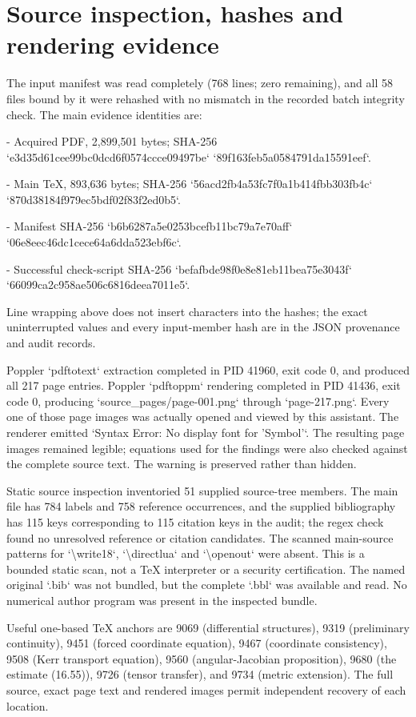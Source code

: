 \documentclass[10pt]{article}
\begin{document}
\section*{Source inspection, hashes and rendering evidence}
The input manifest was read completely (768 lines; zero remaining), and all 58 files bound by it were rehashed with no mismatch in the recorded batch integrity check. The main evidence identities are:\par
- Acquired PDF, 2,899,501 bytes; SHA-256
`e3d35d61cee99bc0dcd6f0574ccce09497be`
`89f163feb5a0584791da15591eef`.\par
- Main TeX, 893,636 bytes; SHA-256
`56acd2fb4a53fc7f0a1b414fbb303fb4c`
`870d38184f979ec5bdf02f83f2ed0b5`.\par
- Manifest SHA-256
`b6b6287a5e0253bcefb11bc79a7e70aff`
`06e8eec46dc1cece64a6dda523ebf6c`.\par
- Successful check-script SHA-256
`befafbde98f0e8e81eb11bea75e3043f`
`66099ca2c958ae506c6816deea7011e5`.\par
Line wrapping above does not insert characters into the hashes; the exact uninterrupted values and every input-member hash are in the JSON provenance and audit records.\par
Poppler `pdftotext` extraction completed in PID 41960, exit code 0, and produced all 217 page entries. Poppler `pdftoppm` rendering completed in PID 41436, exit code 0, producing `source\_pages/page-001.png` through `page-217.png`. Every one of those page images was actually opened and viewed by this assistant. The renderer emitted `Syntax Error: No display font for ’Symbol’`. The resulting page images remained legible; equations used for the findings were also checked against the complete source text. The warning is preserved rather than hidden.\par
Static source inspection inventoried 51 supplied source-tree members. The main file has 784 labels and 758 reference occurrences, and the supplied bibliography has 115 keys corresponding to 115 citation keys in the audit; the regex check found no unresolved reference or citation candidates. The scanned main-source patterns for `\textbackslash{}write18`, `\textbackslash{}directlua` and `\textbackslash{}openout` were absent. This is a bounded static scan, not a TeX interpreter or a security certification. The named original `.bib` was not bundled, but the complete `.bbl` was available and read. No numerical author program was present in the inspected bundle.\par
Useful one-based TeX anchors are 9069 (differential structures), 9319 (preliminary continuity), 9451 (forced coordinate equation), 9467 (coordinate consistency), 9508 (Kerr transport equation), 9560 (angular-Jacobian proposition), 9680 (the estimate (16.55)), 9726 (tensor transfer), and 9734 (metric extension). The full source, exact page text and rendered images permit independent recovery of each location.\par
\end{document}
